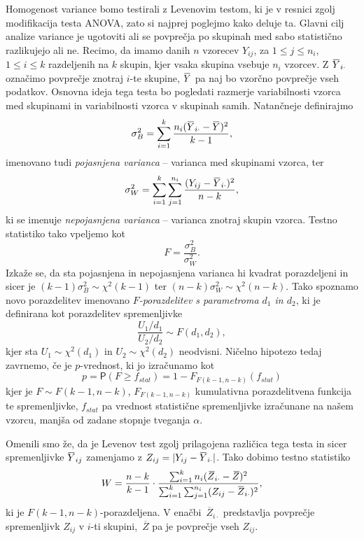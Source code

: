 \documentclass[a4paper,11pt]{article}
\newcommand{\ols}[1]{\mskip.5\thinmuskip\overline{\mskip-.5\thinmuskip {#1} \mskip-.5\thinmuskip}\mskip.5\thinmuskip} %
\newcommand{\olsi}[1]{\,\overline{\!{#1}}} %
\newcommand{\prob}{\mathsf{P}}
\begin{document}
Homogenost variance bomo testirali z Levenovim testom, ki je v resnici zgolj modifikacija testa ANOVA, zato si najprej poglejmo kako deluje ta. Glavni cilj analize variance je ugotoviti ali se povprečja po skupinah med sabo statistično razlikujejo ali ne. Recimo, da imamo danih $n$ vzorecev $Y_{ij}$, za $1 \leq j \leq n_i$, $1 \leq i \leq k$ razdeljenih na $k$ skupin, kjer vsaka skupina vsebuje $n_i$ vzorcev. Z $\ols{Y}_{i\cdot}$ označimo povprečje znotraj $i$-te skupine, $\ols{Y}$ pa naj bo vzorčno povprečje vseh podatkov. Osnovna ideja tega testa bo pogledati razmerje variabilnosti vzorca med skupinami in variabilnosti vzorca v skupinah samih. Natančneje definirajmo 
\[
    \sigma^2_B = \sum_{i = 1}^k \frac{n_i (\ols{Y}_{i \cdot} - \ols{Y})^2}{k-1},
\]
imenovano tudi \emph{pojasnjena varianca} -- varianca med skupinami vzorca, ter
\[
    \sigma^2_W = \sum_{i = 1}^k \sum_{j = 1}^{n_i} \frac{(Y_{ij} - \ols{Y}_{i \cdot})^2}{n - k},
\] 
ki se imenuje \emph{nepojasnjena varianca} -- varianca znotraj skupin vzorca. Testno statistiko tako vpeljemo kot
\[
    F = \frac{\sigma^2_B}{\sigma^2_W}.
\]  
Izkaže se, da sta pojasnjena in nepojasnjena varianca hi kvadrat porazdeljeni in sicer je $(k-1)\sigma^2_B \sim \chi^2(k - 1)$ ter $(n-k)\sigma^2_W \sim \chi^2(n - k)$. Tako spoznamo novo porazdelitev imenovano \emph{$F$-porazdelitev s parametroma $d_1$ in $d_2$}, ki je definirana kot porazdelitev spremenljivke
\[
    \frac{U_1/d_1}{U_2/d_2} \sim F(d_1, d_2),
\] 
kjer sta $U_1 \sim \chi^2(d_1)$ in $U_2 \sim \chi^2(d_2)$ neodvisni. Ničelno hipotezo tedaj zavrnemo, če je $p$-vrednost, ki jo izračunamo kot
\[
    p = \prob(F \geq f_{stat}) = 1 - F_{F(k-1, n - k)}(f_{stat})
\]
kjer je $F \sim F(k - 1, n - k)$, $F_{F(k-1, n - k)}$ kumulativna porazdelitvena funkcija te spremenljivke, $f_{stat}$ pa vrednost statistične spremenljivke izračunane na našem vzorcu, manjša od zadane stopnje tveganja $\alpha$.



Omenili smo že, da je Levenov test zgolj prilagojena različica tega testa in sicer spremenljivke $\ols{Y}_{ij}$ zamenjamo z $Z_{ij} = \lvert Y_{ij} - \ols{Y}_{i \cdot}\rvert$. Tako dobimo testno statistiko 
\[
    W = \frac{n - k}{k - 1} \cdot \frac{\sum_{i = 1}^k n_i (\olsi{Z}_{i \cdot} - \olsi{Z})^2}{\sum_{i = 1}^k \sum_{j = 1}^{n_i} (Z_{ij} - \ols{Z}_{i \cdot})^2},
\] 
ki je $F(k - 1, n - k)$-porazdeljena. V enačbi $\olsi{Z}_{i \cdot}$ predstavlja povprečje spremenljivk $Z_{ij}$ v $i$-ti skupini, $\olsi{Z}$ pa je povprečje vseh $Z_{ij}$.
\newline
\end{document}
